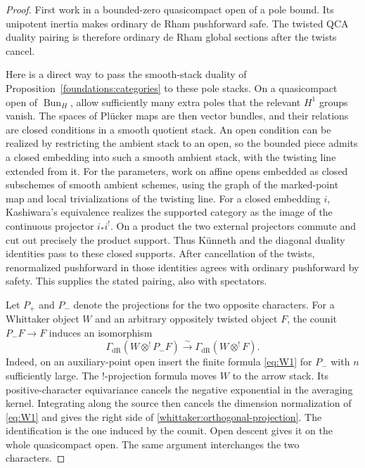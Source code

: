\documentclass[11pt]{article}
\numberwithin{equation}{section}
\theoremstyle{definition}
\theoremstyle{remark}
\begin{document}
\begin{proof}
First work in a bounded-zero quasicompact open of a pole bound. Its
unipotent inertia makes ordinary de Rham pushforward safe. The twisted
QCA duality pairing is therefore ordinary de Rham global sections after
the twists cancel.

Here is a direct way to pass the smooth-stack duality of
Proposition~\ref{foundations:categories} to these pole stacks. On a
quasicompact open of $\operatorname{Bun}_H$, allow sufficiently many extra
poles that the relevant $H^1$ groups vanish. The spaces of Pl\"ucker maps
are then vector bundles, and their relations are closed conditions in a
smooth quotient stack. An open condition can be realized by restricting
the ambient stack to an open, so the bounded piece admits a closed
embedding into such a smooth ambient stack, with the twisting line
extended from it. For the parameters, work on affine opens embedded as closed subschemes
of smooth ambient schemes, using the graph of the marked-point map and
local trivializations of the twisting line. For a closed embedding $i$, Kashiwara's equivalence realizes the
supported category as the image of the continuous projector $i_*i^!$.
On a product the two external projectors commute and cut out precisely
the product support. Thus K\"unneth and the diagonal duality identities
pass to these closed supports. After cancellation of the twists,
renormalized pushforward in those identities agrees with ordinary
pushforward by safety. This supplies the stated pairing, also with
spectators.

Let $P_+$ and $P_-$ denote the projections for the two opposite characters.
For a Whittaker object $W$ and an arbitrary oppositely twisted object $F$,
the counit $P_-F\to F$ induces an isomorphism
\begin{equation}\label{whittaker:orthogonal-projection}
 \Gamma_{\mathrm{dR}}(W\otimes^!P_-F)
 \xrightarrow{\ \sim\ }
 \Gamma_{\mathrm{dR}}(W\otimes^!F).
\end{equation}
Indeed, on an auxiliary-point open insert the finite formula
\eqref{eq:W1} for $P_-$ with $n$ sufficiently large. The $!$-projection
formula moves $W$ to the arrow stack. Its positive-character equivariance
cancels the negative exponential in the averaging kernel. Integrating
along the source then cancels the dimension normalization of
\eqref{eq:W1} and gives the right side of
\eqref{whittaker:orthogonal-projection}. The identification is the one
induced by the counit. Open descent gives it on the whole quasicompact
open. The same argument interchanges the two characters.


\end{proof}
\end{document}
